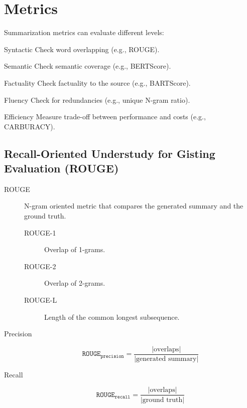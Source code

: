 \section{Metrics}

Summarization metrics can evaluate different levels:
\begin{descriptionlist}
    \item[Syntactic] 
        Check word overlapping (e.g., ROUGE). 
    \item[Semantic] 
        Check semantic coverage (e.g., BERTScore). 
    \item[Factuality] 
        Check factuality to the source (e.g., BARTScore).
    \item[Fluency] 
        Check for redundancies (e.g., unique N-gram ratio).
    \item[Efficiency] 
        Measure trade-off between performance and costs (e.g., CARBURACY). 
\end{descriptionlist}


\subsection{Recall-Oriented Understudy for Gisting Evaluation (ROUGE)}

\begin{description}
    \item[ROUGE] 
        N-gram oriented metric that compares the generated summary and the ground truth.

        \begin{description}
            \item[ROUGE-1] Overlap of 1-grams.
            \item[ROUGE-2] Overlap of 2-grams.
            \item[ROUGE-L] Length of the common longest subsequence.
        \end{description}
\end{description}


\begin{description}
    \item[Precision] 
        \[ \texttt{ROUGE}_\texttt{precision} = \frac{\vert \text{overlaps} \vert}{\vert \text{generated summary} \vert} \]

    \item[Recall] 
        \[ \texttt{ROUGE}_\texttt{recall} = \frac{\vert \text{overlaps} \vert}{\vert \text{ground truth} \vert} \]
\end{description}


